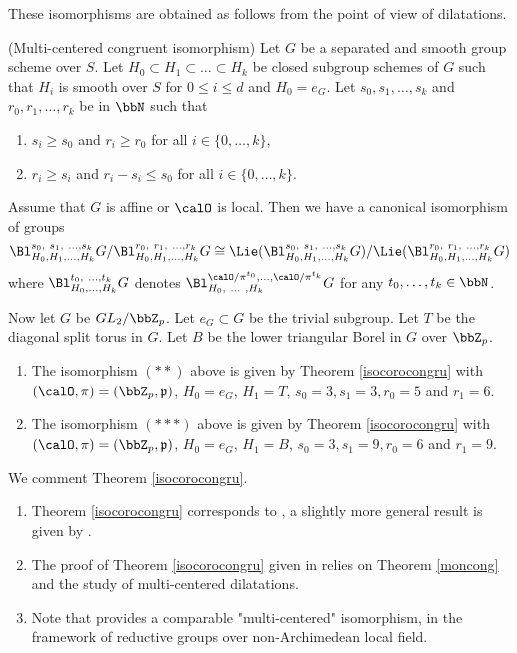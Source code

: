\documentclass[10pt]{alggeom}
\renewcommand{\geq}{\geqslant}
\renewcommand{\leq}{\leqslant}
\theoremstyle{definition}
\numberwithin{equation}{section}
\begin{document}
These isomorphisms are obtained as follows from the point of view of dilatations.


\theo[\cite{Ma23d}] \label{isocorocongru} (Multi-centered congruent isomorphism)
Let $G$ be a separated and smooth group scheme over $S$. Let $H_0 \subset H_1 \subset \ldots \subset  H_k$ be closed subgroup schemes of $G$ such that $H_i$ is smooth over $S$ for $0 \leq i \leq d$ and $H_0=e_G$. Let $s_0 , s_1 , \ldots , s_k$ and $r_0 , r_1 , \ldots , r_k$ be in $\bbN$ such that  
 \begin{enumerate}
 \item $s_i \geq s_0 $ and $r_i \geq r_0 $ for all $i \in \{0, \ldots , k\}$,
 \item $ r_i \geq s_i $ and $r_i-s_i \leq s_0$ for all $i \in \{0, \ldots , k \}$.
  \end{enumerate}  Assume that $G$ is affine or $\calO $ is local.  Then we have a canonical isomorphism of groups
 \[ \Bl_{H_0, H_1 , \ldots , H_k}^{s_0 ,~ s_1 ,~ \ldots , s_k} G /  \Bl_{H_0, H_1 , \ldots , H_k}^{r_0 ,~ r_1 ,~ \ldots , r_k} G    \cong \Lie (\Bl_{H_0, H_1 , \ldots , H_k}^{s_0 ,~ s_1 ,~ \ldots , s_k} G ) / \Lie ( \Bl_{H_0, H_1 , \ldots , H_k}^{r_0 ,~ r_1 ,~ \ldots , r_k} G   )  \]
where $\Bl_{H_0, \ldots , H_k}^{t_0 ,~ \ldots , t_k} G  $ denotes $ \Bl_{H_0,  ~\ldots~ , H_k}^{\calO/\pi ^{t_0}, \ldots ,  \calO /\pi^{t_k}} G $ for any $t_0 , \ldots , t_k \in \bbN$.
\xtheo

 
Now let $G$ be $ GL_2 /\bbZ _p$. Let $ e_G \subset G$ be the trivial subgroup. Let $T$ be the diagonal split torus in $G$. Let $B$ be the lower triangular Borel in $G$ over $\bbZ_p$. \begin{enumerate} \item The isomorphism $(**)$ above is given by Theorem \ref{isocorocongru} with 
$(\calO , \pi ) =(\bbZ _p,  \mathfrak{p} )$, $H_0=e_G$, $H_1= T$, $s_0 =3, s_1=3, r_0= 5 $ and $r_1=6$.
\item The isomorphism $(***)$ above is given by Theorem \ref{isocorocongru} with 
$(\calO , \pi )= (\bbZ _p,  \mathfrak{p} )$, $H_0=e_G$, $H_1= B$, $s_0 =3, s_1=9, r_0= 6 $ and $r_1=9$.
\end{enumerate}

\rema We comment Theorem \ref{isocorocongru}.
\begin{enumerate} 
\item Theorem \ref{isocorocongru} corresponds to \cite[Corollary 8.3]{Ma23d}, a slightly more general result is given by \cite[Theorem 8.1]{Ma23d}.
\item The proof of Theorem \ref{isocorocongru} given in \cite{Ma23d} relies on Theorem \ref{moncong} and the study of multi-centered dilatations.

\item  Note that \cite[Lemma 1.3]{Yu01} provides a comparable "multi-centered" isomorphism, in the framework of reductive groups over non-Archimedean local field.
 \end{enumerate} \xrema
 
\end{document}
